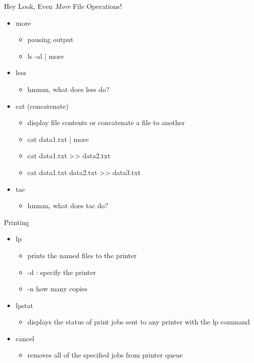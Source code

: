 \documentclass{beamer}
\begin{document}
\begin{frame}{Hey Look, Even \textit{More} File Operations!}
\begin{itemize}
\item more
\begin{itemize}
\item pausing output
\item ls -al | more
\end{itemize}
\item less
\begin{itemize}
\item hmmm, what does less do?
\end{itemize}
\item cat (concatenate)
\begin{itemize}
\item display file contents or concatenate a file to another
\item cat data1.txt | more
\item cat data1.txt >> data2.txt
\item cat data1.txt data2.txt >> data3.txt
\end{itemize}
\item tac
\begin{itemize}
\item hmmm, what does tac do?
\end{itemize}
\end{itemize}
\end{frame}

\begin{frame}{Printing}
\begin{itemize}
\item lp
\begin{itemize}
\item prints the named files to the printer
\item -d : specify the printer
\item -n how many copies
\end{itemize}
\item lpstat
\begin{itemize}
\item displays the status of print jobs sent to any printer with the lp command
\end{itemize}
\item cancel
\begin{itemize}
\item removes all of the specified jobs from printer queue
\end{itemize}
\end{itemize}
\end{frame}
\end{document}
